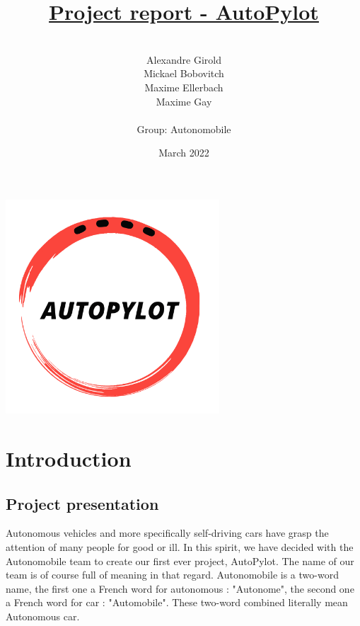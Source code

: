 \documentclass[12pt]{article}
\begin{document}
\title{\underline{Project report - AutoPylot}}
\date{March 2022}


\author{%
    \\
    Alexandre Girold\\
    Mickael Bobovitch \\
    Maxime Ellerbach \\
    Maxime Gay \\ \\
    Group: Autonomobile 
    }

\maketitle

\centerline{\includegraphics[height=8cm]{../../logos/logo-transparent-black.png}}
\newpage

\tableofcontents
\newpage

\section{Introduction}

\subsection{Project presentation}
Autonomous vehicles and more specifically self-driving cars have grasp the attention of many people for good or ill. In this spirit, we have decided with the Autonomobile team to create our first ever project, AutoPylot. The name of our team is of course full of meaning in that regard. Autonomobile is a two-word name, the first one a French word for autonomous : "Autonome", the second one a French word for car : "Automobile". These two-word combined literally mean Autonomous car.\\
\end{document}
